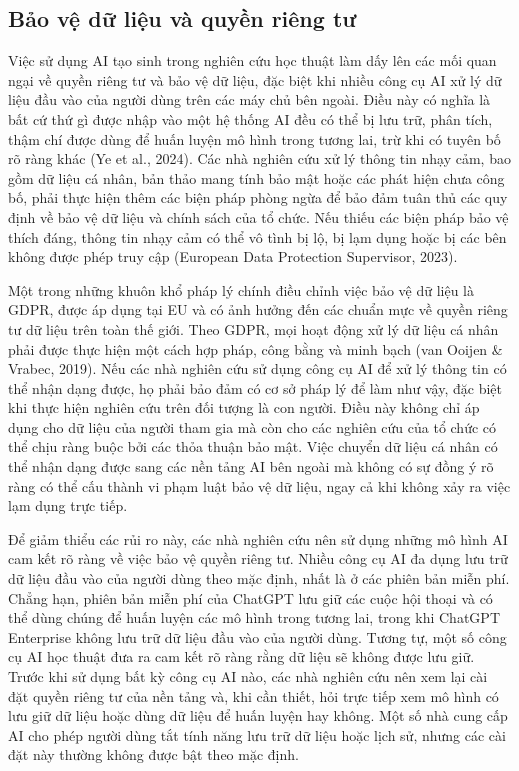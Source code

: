 \subsection{\texorpdfstring{\textbf{Bảo vệ dữ liệu và quyền riêng tư}}{Bảo vệ dữ liệu và quyền riêng tư}}

Việc sử dụng AI tạo sinh trong nghiên cứu học thuật làm dấy lên các mối quan ngại về quyền riêng tư và bảo vệ dữ liệu, đặc biệt khi nhiều công cụ AI xử lý dữ liệu đầu vào của người dùng trên các máy chủ bên ngoài. Điều này có nghĩa là bất cứ thứ gì được nhập vào một hệ thống AI đều có thể bị lưu trữ, phân tích, thậm chí được dùng để huấn luyện mô hình trong tương lai, trừ khi có tuyên bố rõ ràng khác (Ye et al., 2024). Các nhà nghiên cứu xử lý thông tin nhạy cảm, bao gồm dữ liệu cá nhân, bản thảo mang tính bảo mật hoặc các phát hiện chưa công bố, phải thực hiện thêm các biện pháp phòng ngừa để bảo đảm tuân thủ các quy định về bảo vệ dữ liệu và chính sách của tổ chức. Nếu thiếu các biện pháp bảo vệ thích đáng, thông tin nhạy cảm có thể vô tình bị lộ, bị lạm dụng hoặc bị các bên không được phép truy cập (European Data Protection Supervisor, 2023).

Một trong những khuôn khổ pháp lý chính điều chỉnh việc bảo vệ dữ liệu là GDPR, được áp dụng tại EU và có ảnh hưởng đến các chuẩn mực về quyền riêng tư dữ liệu trên toàn thế giới. Theo GDPR, mọi hoạt động xử lý dữ liệu cá nhân phải được thực hiện một cách hợp pháp, công bằng và minh bạch (van Ooijen \& Vrabec, 2019). Nếu các nhà nghiên cứu sử dụng công cụ AI để xử lý thông tin có thể nhận dạng được, họ phải bảo đảm có cơ sở pháp lý để làm như vậy, đặc biệt khi thực hiện nghiên cứu trên đối tượng là con người. Điều này không chỉ áp dụng cho dữ liệu của người tham gia mà còn cho các nghiên cứu của tổ chức có thể chịu ràng buộc bởi các thỏa thuận bảo mật. Việc chuyển dữ liệu cá nhân có thể nhận dạng được sang các nền tảng AI bên ngoài mà không có sự đồng ý rõ ràng có thể cấu thành vi phạm luật bảo vệ dữ liệu, ngay cả khi không xảy ra việc lạm dụng trực tiếp.

Để giảm thiểu các rủi ro này, các nhà nghiên cứu nên sử dụng những mô hình AI cam kết rõ ràng về việc bảo vệ quyền riêng tư. Nhiều công cụ AI đa dụng lưu trữ dữ liệu đầu vào của người dùng theo mặc định, nhất là ở các phiên bản miễn phí. Chẳng hạn, phiên bản miễn phí của ChatGPT lưu giữ các cuộc hội thoại và có thể dùng chúng để huấn luyện các mô hình trong tương lai, trong khi ChatGPT Enterprise không lưu trữ dữ liệu đầu vào của người dùng. Tương tự, một số công cụ AI học thuật đưa ra cam kết rõ ràng rằng dữ liệu sẽ không được lưu giữ. Trước khi sử dụng bất kỳ công cụ AI nào, các nhà nghiên cứu nên xem lại cài đặt quyền riêng tư của nền tảng và, khi cần thiết, hỏi trực tiếp xem mô hình có lưu giữ dữ liệu hoặc dùng dữ liệu để huấn luyện hay không. Một số nhà cung cấp AI cho phép người dùng tắt tính năng lưu trữ dữ liệu hoặc lịch sử, nhưng các cài đặt này thường không được bật theo mặc định.

